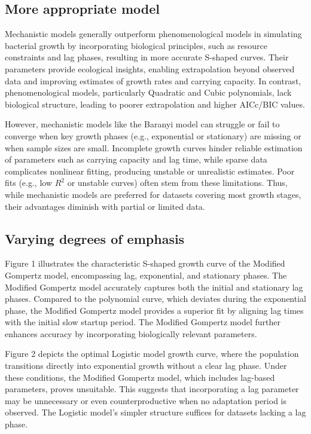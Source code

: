 \documentclass{article}
\begin{document}
\subsection{More appropriate model}

Mechanistic models generally outperform phenomenological models in simulating bacterial growth by incorporating biological principles, such as resource constraints and lag phases, resulting in more accurate S-shaped curves. Their parameters provide ecological insights, enabling extrapolation beyond observed data and improving estimates of growth rates and carrying capacity. In contrast, phenomenological models, particularly Quadratic and Cubic polynomials, lack biological structure, leading to poorer extrapolation and higher AICc/BIC values.



However, mechanistic models like the Baranyi model can struggle or fail to converge when key growth phases (e.g., exponential or stationary) are missing or when sample sizes are small. Incomplete growth curves hinder reliable estimation of parameters such as carrying capacity and lag time, while sparse data complicates nonlinear fitting, producing unstable or unrealistic estimates. Poor fits (e.g., low $R^2$ or unstable curves) often stem from these limitations. Thus, while mechanistic models are preferred for datasets covering most growth stages, their advantages diminish with partial or limited data.





\subsection{Varying degrees of emphasis}

Figure 1 illustrates the characteristic S-shaped growth curve of the Modified Gompertz model, encompassing lag, exponential, and stationary phases. The Modified Gompertz model accurately captures both the initial and stationary lag phases. Compared to the polynomial curve, which deviates during the exponential phase, the Modified Gompertz model provides a superior fit by aligning lag times with the initial slow startup period. The Modified Gompertz model further enhances accuracy by incorporating biologically relevant parameters.



Figure 2 depicts the optimal Logistic model growth curve, where the population transitions directly into exponential growth without a clear lag phase. Under these conditions, the Modified Gompertz model, which includes lag-based parameters, proves unsuitable. This suggests that incorporating a lag parameter may be unnecessary or even counterproductive when no adaptation period is observed. The Logistic model’s simpler structure suffices for datasets lacking a lag phase.
\end{document}
